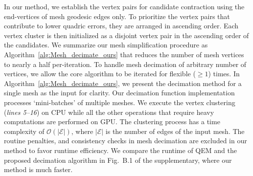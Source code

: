In our method, we establish the vertex pairs for candidate contraction using the end-vertices of mesh geodesic edges only. 
To prioritize the vertex pairs that contribute to lower quadric errors, they are arranged in ascending order.  
Each vertex cluster is then initialized as a disjoint vertex pair in the ascending order of the candidates.
We summarize our mesh simplification procedure as Algorithm~\ref{alg:Mesh_decimate_ours} that reduces the number of mesh vertices to nearly a half per-iteration.
To handle mesh decimation of arbitrary number of vertices, we allow the core algorithm to be iterated for flexible (${\geqslant}1$) times.
In Algorithm~\ref{alg:Mesh_decimate_ours}, we present the decimation method for a single mesh as the input for clarity. Our decimation function implementation processes `mini-batches' of multiple meshes. 
We execute the vertex clustering (\textit{lines 5--16}) on CPU while all the other operations that require heavy computations are performed on GPU. The clustering process has a time complexity of  $\mathcal{O}(|\mathcal{E}|)$,  where $|\mathcal{E}|$ is the number of edges of the input mesh.
The routine penalties, and consistency checks in mesh decimation are excluded in our method to favor runtime efficiency. We compare the runtime of QEM and the proposed decimation algorithm in Fig.~B.1 of the supplementary, where our method is much faster.

